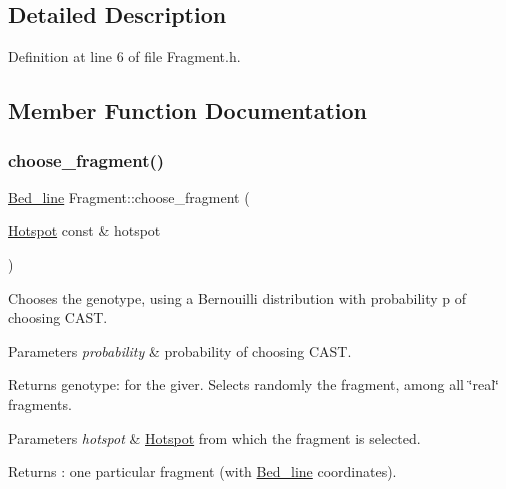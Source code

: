 \subsection{Detailed Description}


Definition at line 6 of file Fragment.\+h.



\subsection{Member Function Documentation}
\mbox{\label{class_fragment_a0a7efd717d2eb453f380c261b43cd08d}} 
\subsubsection{\texorpdfstring{choose\+\_\+fragment()}{choose\_fragment()}}
{\footnotesize\ttfamily \mbox{\hyperlink{struct_bed__line}{Bed\+\_\+line}} Fragment\+::choose\+\_\+fragment (\begin{DoxyParamCaption}\item[{\mbox{\hyperlink{class_hotspot}{Hotspot}} const \&}]{hotspot }\end{DoxyParamCaption})}

Chooses the genotype, using a Bernouilli distribution with probability p of choosing C\+A\+ST.


\begin{DoxyParams}{Parameters}
{\em probability} & probability of choosing C\+A\+ST. \\
\hline
\end{DoxyParams}
\begin{DoxyReturn}{Returns}
genotype\+: for the giver. Selects randomly the fragment, among all \char`\"{}real\char`\"{} fragments. 
\end{DoxyReturn}

\begin{DoxyParams}{Parameters}
{\em hotspot} & \mbox{\hyperlink{class_hotspot}{Hotspot}} from which the fragment is selected. \\
\hline
\end{DoxyParams}
\begin{DoxyReturn}{Returns}
\+: one particular fragment (with \mbox{\hyperlink{struct_bed__line}{Bed\+\_\+line}} coordinates). 
\end{DoxyReturn}


